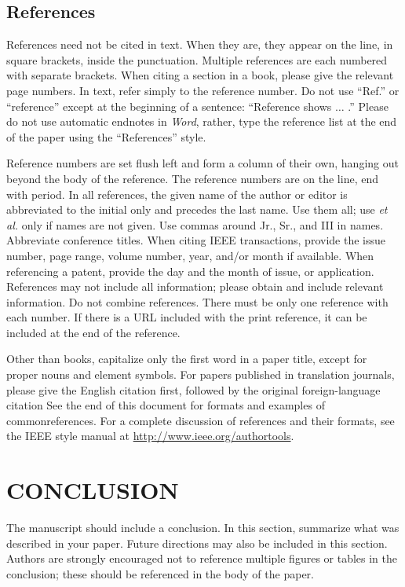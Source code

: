 \documentclass{IEEEcsmag}
\begin{document}
\subsection{References}


References need not be cited in text. When they are, they appear on the 
line, in square brackets, inside the punctuation. Multiple references are 
each numbered with separate brackets. When citing a section in a book, 
please give the relevant page numbers. In text, refer simply to the 
reference number. Do not use ``Ref.'' or ``reference'' except at the 
beginning of a sentence: ``Reference \cite{CC1} shows $\ldots$ .'' Please do not use 
automatic endnotes in \emph{Word}, rather, type the reference list at the end of the 
paper using the ``References'' style.

Reference numbers are set flush left and form a column of their own, hanging 
out beyond the body of the reference. The reference numbers are on the line, 
end with period. In all references, the given name of the author 
or editor is abbreviated to the initial only and precedes the last name. Use 
them all; use \emph{et al.} only if names are not given. Use commas around Jr., 
Sr., and III in names. Abbreviate conference titles. When citing IEEE 
transactions, provide the issue number, page range, volume number, year, 
and/or month if available. When referencing a patent, provide the day and 
the month of issue, or application. References may not include all 
information; please obtain and include relevant information. Do not combine 
references. There must be only one reference with each number. If there is a 
URL included with the print reference, it can be included at the end of the 
reference. 

Other than books, capitalize only the first word in a paper title, except 
for proper nouns and element symbols. For papers published in translation 
journals, please give the English citation first, followed by the original 
foreign-language citation See the end of this document for formats and 
examples of common\break references. For a complete discussion of references and 
their formats, see the IEEE style manual at
\url{http://www.ieee.org/authortools}.

\section{CONCLUSION}

The manuscript should include a conclusion. In this section, summarize what was described in your paper. Future directions may also be included in this section. Authors are strongly encouraged not to reference multiple figures or tables in the conclusion; these should be referenced in the body of the paper.
\end{document}
